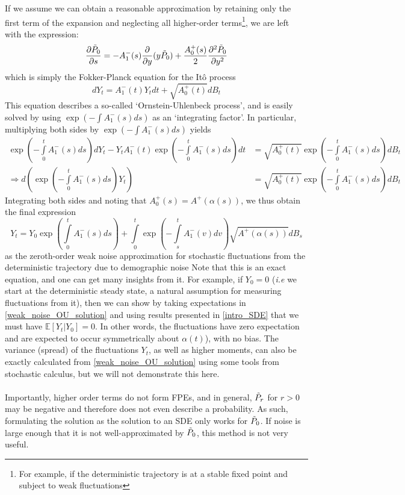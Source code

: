 If we assume we can obtain a reasonable approximation by retaining only the first term of the expansion and neglecting all higher-order terms\footnote{For example, if the deterministic trajectory is at a stable fixed point and subject to weak fluctuations}, we are left with the expression:
\begin{equation}
\label{1D_WNA}
\frac{\partial \Tilde{P}_0}{\partial s} = -A^-_1(s)\frac{\partial}{\partial y}(y\Tilde{P}_0) + \frac{A^+_{0}(s)}{2}\frac{\partial^2 \Tilde{P}_{0}}{\partial y^2}
\end{equation}
which is simply the Fokker-Planck equation for the It\^{o} process
\begin{equation*}
    dY_t = A^-_1(t)Y_tdt + \sqrt{A^+_0(t)}dB_t
\end{equation*}
This equation describes a so-called `Ornstein-Uhlenbeck process', and is easily solved by using $\exp(-\int A^-_1(s)ds)$ as an `integrating factor'. In particular, multiplying both sides by $\exp(-\int A^-_1(s)ds)$ yields
\begin{align*}
    \exp\left(-{\int\limits_{0}^{t}A^-_1(s)ds}\right)dY_t - Y_tA^-_1(t)\exp\left(-{\int\limits_{0}^{t}A^-_1(s)ds}\right)dt &= \sqrt{A^+_0(t)}\exp\left(-{\int\limits_{0}^{t}A^-_1(s)ds}\right)dB_t\\
    \Rightarrow d\left(\exp\left(-{\int\limits_{0}^{t}A^-_1(s)ds}\right)Y_t\right) &= \sqrt{A^+_0(t)}\exp\left(-{\int\limits_{0}^{t}A^-_1(s)ds}\right)dB_t
\end{align*}
Integrating both sides and noting that $A^+_0(s) = A^+(\alpha(s))$, we thus obtain the final expression
\begin{equation}
\label{weak_noise_OU_solution}
    Y_t = Y_0\exp\left({\int\limits_{0}^{t}A^-_1(s)ds}\right)+\int\limits_{0}^{t}\exp\left(-\int\limits_{s}^{t}A^-_{1}(v)dv\right)\sqrt{A^+(\alpha(s))}dB_s
\end{equation}
as the zeroth-order weak noise approximation for stochastic fluctuations from the deterministic trajectory due to demographic noise Note that this is an exact equation, and one can get many insights from it. For example, if $Y_0 = 0$ (\emph{i.e} we start at the deterministic steady state, a natural assumption for measuring fluctuations from it), then we can show by taking expectations in \eqref{weak_noise_OU_solution} and using results presented in \ref{intro_SDE} that we must have $\mathbb{E}[Y_t | Y_0] = 0$. In other words, the fluctuations have zero expectation and are expected to occur symmetrically about $\alpha(t)$), with no bias. The variance (spread) of the fluctuations $Y_t$, as well as higher moments, can also be exactly calculated from \eqref{weak_noise_OU_solution} using some tools from stochastic calculus, but we will not demonstrate this here.\\
\\
Importantly, higher order terms do not form FPEs, and in general, $\Tilde{P}_r$ for $r>0$ may be negative and therefore does not even describe a probability. As such, formulating the solution as the solution to an SDE only works for $\Tilde{P}_0$. If noise is large enough that it is not well-approximated by $\Tilde{P}_0$, this method is not very useful.

